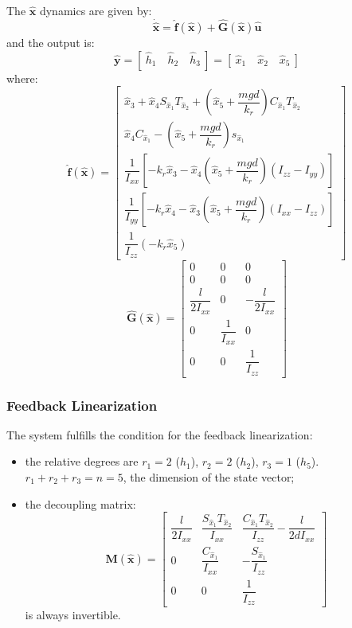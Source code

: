 \documentclass[11pt,a4paper]{scrartcl}
\begin{document}
The $ \mathbf{\hat{x}} $ dynamics are given by:
\begin{equation}
	\mathbf{\dot{\hat{x}}=\hat{f}(\hat{x})+\hat{G}(\hat{x})\hat{u}}
\end{equation}
and the output is:
\begin{equation}
	\mathbf{\hat{y}}= [ \ \hat{h}_1 \quad \hat{h}_2 \quad \hat{h}_3 \ ] = [ \ \hat{x}_1 \quad \hat{x}_2 \quad \hat{x}_5 \ ]
\end{equation}
where:
\renewcommand{\arraystretch}{1.6}
\begin{equation}
	\mathbf{\hat{f}(\hat{x})}=
	\begin{bmatrix}
	\hat{x}_3 + \hat{x}_4 S_{\hat{x}_1} T_{\hat{x}_2} + (\hat{x}_5 + \dfrac{mgd}{k_r}) C_{\hat{x}_1} T_{\hat{x}_2} \\
	\hat{x}_4 C_{\hat{x}_1} - (\hat{x}_5 + \dfrac{mgd}{k_r}) s_{\hat{x}_1}  \\
	\dfrac{1}{I_{xx}} [-k_r \hat{x}_3 - \hat{x}_4(\hat{x}_5 + \dfrac{mgd}{k_r}) (I_{zz} - I_{yy}) ] \\
	\dfrac{1}{I_{yy}} [-k_r \hat{x}_4 - \hat{x}_3(\hat{x}_5 + \dfrac{mgd}{k_r}) (I_{xx} - I_{zz})] \\
	\dfrac{1}{I_{zz}} (-k_r \hat{x}_5)
	\end{bmatrix}
\end{equation}
\renewcommand{\arraystretch}{1}
\begin{equation}
	\mathbf{\hat{G}(\hat{x})} =
	\begin{bmatrix}
	0 & 0 & 0 \\
	0 & 0 & 0 \\
	\dfrac{l}{2I_{xx}} & 0 & -\dfrac{l}{2I_{xx}} \\
	0 & \dfrac{1}{I_{xx}} & 0 \\
	0 & 0 & \dfrac{1}{I_{zz}}	
	\end{bmatrix}
\end{equation}


\subsubsection{Feedback Linearization}

The system fulfills the condition for the feedback linearization:
\begin{itemize}
	\item the relative degrees are $ r_1 = 2 $ ($ h_1 $), $ r_2 = 2 $ ($ h_2 $), $ r_3 = 1 $ ($ h_5 $). $ r_1 + r_2 + r_3 = n = 5 $, the dimension of the state vector;
 
	\item the decoupling matrix:
	\begin{equation}
	\mathbf{M(\hat{x})} = 
	\begin{bmatrix}
	\dfrac{l}{2I_{xx}} & \dfrac{S_{\hat{x}_1} T_{\hat{x}_2}}{I_{xx}} & \dfrac{C_{\hat{x}_1}T_{\hat{x}_2}}{I_{zz}} -\dfrac{l}{2dI_{xx}} \\
	0 & \dfrac{C_{\hat{x}_1}}{I_{xx}} & -\dfrac{S_{\hat{x}_1}}{I_{zz}} \\
	0 & 0 & \dfrac{1}{I_{zz}} 
	\end{bmatrix}
	\end{equation}
	is always invertible.
\end{itemize}
\end{document}
